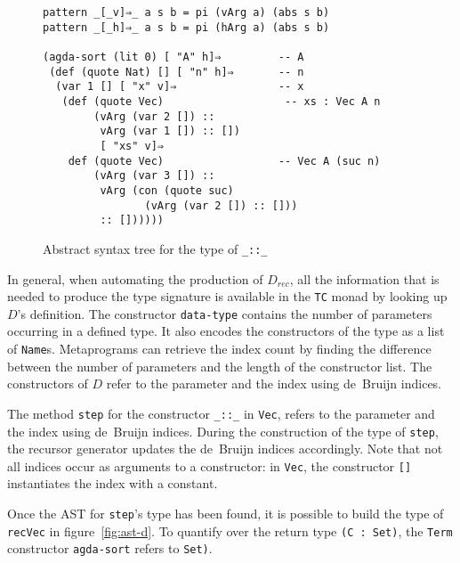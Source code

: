 \documentclass[sigplan,10pt]{acmart}
\begin{document}
\begin{figure}
\begin{center}
\begingroup
\fontsize{9pt}{10pt}\selectfont
\begin{Verbatim}
pattern _[_v]⇒_ a s b = pi (vArg a) (abs s b)
pattern _[_h]⇒_ a s b = pi (hArg a) (abs s b)

(agda-sort (lit 0) [ "A" h]⇒         -- A
 (def (quote Nat) [] [ "n" h]⇒       -- n
  (var 1 [] [ "x" v]⇒                -- x
   (def (quote Vec)                   -- xs : Vec A n
        (vArg (var 2 []) ::
         vArg (var 1 []) :: [])
         [ "xs" v]⇒
    def (quote Vec)                  -- Vec A (suc n)
        (vArg (var 3 []) ::
         vArg (con (quote suc)
                (vArg (var 2 []) :: []))
         :: [])))))
\end{Verbatim}
\endgroup
\end{center}
\caption{Abstract syntax tree for the type of {\tt \_::\_}}
\label{fig:ast-g}
\end{figure}
\normalsize

In general, when automating the production of $D_{\mathit{rec}}$, all the information that is needed to produce the type signature is available in the \texttt{TC} monad by looking up $D$'s definition.
The constructor {\tt data-type} contains the number of parameters occurring in a defined type. It also encodes the constructors of the type as a list of \texttt{Name}s. Metaprograms can retrieve the index count by finding the difference between the number of parameters and the length of the constructor list. The constructors of $D$ refer to the parameter and the index using de~Bruijn indices.

The method {\tt step} for the constructor {\tt \_::\_} in {\tt Vec}, refers to the parameter and the index using de~Bruijn indices.
During the construction of the type of {\tt step}, the recursor generator updates the de~Bruijn indices accordingly.
Note that not all indices occur as arguments to a constructor: in {\tt Vec}, the constructor {\tt []} instantiates the index with a constant.

Once the AST for {\tt step}'s type has been found, it is possible to build the type of {\tt recVec} in figure~\ref{fig:ast-d}.
To quantify over the return type \texttt{(C : Set)}, the \texttt{Term} constructor \texttt{agda-sort} refers to \texttt{Set)}. 
\end{document}
